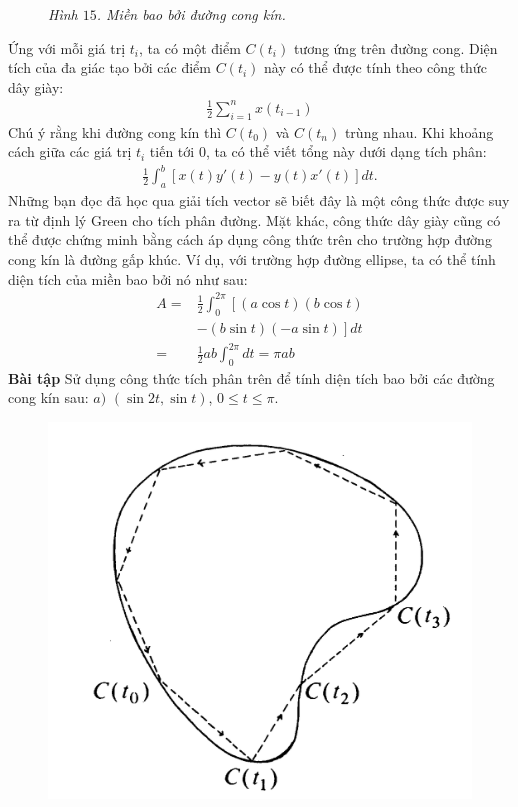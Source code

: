 \begin{multicols}{2}
\begin{figure}[H]
		\caption{\small\textit{\color{toanhocdoisong}Hình $15$. Miền bao bởi đường cong kín.}}
		\vspace*{-10pt}
	\end{figure}
	Ứng với mỗi giá trị $t_i$, ta có một điểm $C(t_i)$ tương ứng trên đường cong.
	\vskip 0.1cm 
	Diện tích của đa giác tạo bởi các điểm $C(t_i)$ này có thể được tính theo công thức dây giày:
	\begin{align*}
		\frac{1}{2}\sum\limits_{i = 1}^n {x\left( {{t_{i - 1}}} \right)}
	\end{align*}
		Chú ý rằng khi đường cong kín thì $C(t_0)$ và $C(t_n)$ trùng nhau.
		\vskip 0.1cm
		Khi khoảng cách giữa các giá trị $t_i$ tiến tới $0$, ta có thể viết tổng này dưới dạng tích phân:
		\begin{align*}
			\frac{1}{2}\int_a^b {\left[ {x(t)y'(t) - y(t)x'(t)} \right]dt.}
		\end{align*}
		Những bạn đọc đã học qua giải tích vector sẽ biết đây là một công thức được suy ra từ định lý Green cho tích phân đường. Mặt khác, công thức dây giày cũng có thể được chứng minh bằng cách áp dụng công thức trên cho trường hợp đường cong kín là đường gấp khúc.
		\vskip 0.1cm
		Ví dụ, với trường hợp đường ellipse, ta có thể tính diện tích của miền bao bởi nó như sau:
		\begin{align*}
			A =& \frac{1}{2}\int_0^{2\pi } \left[ (a\cos t)(b\cos t) \right.\\
				&\left.- (b\sin t)( - a\sin t) \right]dt \\
				= &\frac{1}{2}ab\int_0^{2\pi } dt = \pi ab 
		\end{align*}
		\textbf{\color{toanhocdoisong}Bài tập}
		\vskip 0.1cm
		Sử dụng công thức tích phân trên để tính diện tích bao bởi các đường cong kín sau:
		$a)$ $(\sin2t,\sin t)$, $0\le t \le \pi$.
		\begin{figure}[H]
			\vspace*{-5pt}
			\centering
			\captionsetup{labelformat= empty, justification=centering}
			\includegraphics[width= 0.7\linewidth]{21}

\end{figure}
\end{multicols}
